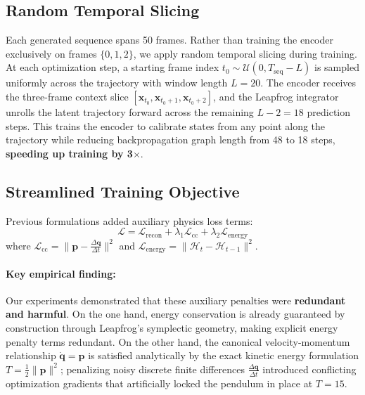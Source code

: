 \documentclass[11pt]{article}
\begin{document}
\subsection{Random Temporal Slicing}

Each generated sequence spans 50 frames. Rather than training the encoder exclusively on frames $\{0, 1, 2\}$, we apply random temporal slicing during training. At each optimization step, a starting frame index $t_0 \sim \mathcal{U}(0, T_{\text{seq}} - L)$ is sampled uniformly across the trajectory with window length $L = 20$. The encoder receives the three-frame context slice $[\mathbf{x}_{t_0}, \mathbf{x}_{t_0+1}, \mathbf{x}_{t_0+2}]$, and the Leapfrog integrator unrolls the latent trajectory forward across the remaining $L - 2 = 18$ prediction steps. This trains the encoder to calibrate states from any point along the trajectory while reducing backpropagation graph length from 48 to 18 steps, \textbf{speeding up training by 3$\times$}.

\subsection{Streamlined Training Objective}

Previous formulations added auxiliary physics loss terms:
\begin{equation}
    \mathcal{L} = \mathcal{L}_{\text{recon}} + \lambda_1 \mathcal{L}_{\text{cc}} + \lambda_2 \mathcal{L}_{\text{energy}}
\end{equation}
where $\mathcal{L}_{\text{cc}} = \| \mathbf{p} - \frac{\Delta \mathbf{q}}{\Delta t} \|^2$ and $\mathcal{L}_{\text{energy}} = \| \mathcal{H}_{t} - \mathcal{H}_{t-1} \|^2$.

\paragraph{Key empirical finding:} Our experiments demonstrated that these auxiliary penalties were \textbf{redundant and harmful}. On the one hand, energy conservation is already guaranteed by construction through Leapfrog's symplectic geometry, making explicit energy penalty terms redundant. On the other hand, the canonical velocity-momentum relationship $\dot{\mathbf{q}} = \mathbf{p}$ is satisfied analytically by the exact kinetic energy formulation $T = \frac{1}{2}\|\mathbf{p}\|^2$; penalizing noisy discrete finite differences $\frac{\Delta \mathbf{q}}{\Delta t}$ introduced conflicting optimization gradients that artificially locked the pendulum in place at $T=15$.
\end{document}
